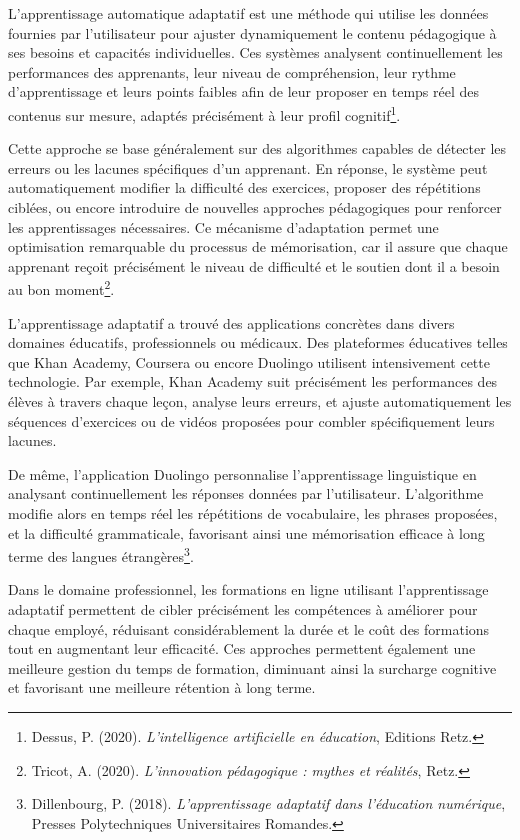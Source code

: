 \documentclass[11pt,a4paper]{report}
\begin{document}
L’apprentissage automatique adaptatif est une méthode qui utilise les données fournies par l’utilisateur pour ajuster dynamiquement le contenu pédagogique à ses besoins et capacités individuelles. Ces systèmes analysent continuellement les performances des apprenants, leur niveau de compréhension, leur rythme d'apprentissage et leurs points faibles afin de leur proposer en temps réel des contenus sur mesure, adaptés précisément à leur profil cognitif\footnote{Dessus, P. (2020). \textit{L'intelligence artificielle en éducation}, Editions Retz.}.

Cette approche se base généralement sur des algorithmes capables de détecter les erreurs ou les lacunes spécifiques d’un apprenant. En réponse, le système peut automatiquement modifier la difficulté des exercices, proposer des répétitions ciblées, ou encore introduire de nouvelles approches pédagogiques pour renforcer les apprentissages nécessaires. Ce mécanisme d’adaptation permet une optimisation remarquable du processus de mémorisation, car il assure que chaque apprenant reçoit précisément le niveau de difficulté et le soutien dont il a besoin au bon moment\footnote{Tricot, A. (2020). \textit{L'innovation pédagogique : mythes et réalités}, Retz.}.

L’apprentissage adaptatif a trouvé des applications concrètes dans divers domaines éducatifs, professionnels ou médicaux. Des plateformes éducatives telles que Khan Academy, Coursera ou encore Duolingo utilisent intensivement cette technologie. Par exemple, Khan Academy suit précisément les performances des élèves à travers chaque leçon, analyse leurs erreurs, et ajuste automatiquement les séquences d’exercices ou de vidéos proposées pour combler spécifiquement leurs lacunes.

De même, l'application Duolingo personnalise l’apprentissage linguistique en analysant continuellement les réponses données par l’utilisateur. L’algorithme modifie alors en temps réel les répétitions de vocabulaire, les phrases proposées, et la difficulté grammaticale, favorisant ainsi une mémorisation efficace à long terme des langues étrangères\footnote{Dillenbourg, P. (2018). \textit{L'apprentissage adaptatif dans l’éducation numérique}, Presses Polytechniques Universitaires Romandes.}.

Dans le domaine professionnel, les formations en ligne utilisant l’apprentissage adaptatif permettent de cibler précisément les compétences à améliorer pour chaque employé, réduisant considérablement la durée et le coût des formations tout en augmentant leur efficacité. Ces approches permettent également une meilleure gestion du temps de formation, diminuant ainsi la surcharge cognitive et favorisant une meilleure rétention à long terme.
\end{document}
